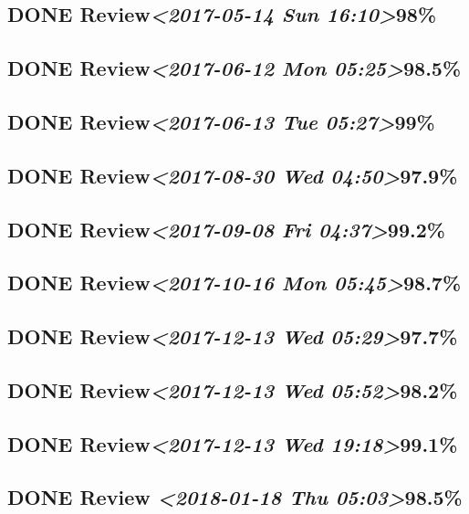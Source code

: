 \documentclass[11pt]{ctexart}
\begin{document}
\subsection{{\bfseries\sffamily DONE} Review\textit{<2017-05-14 Sun 16:10>}98\%}
\label{sec:org10a5b18}
\subsection{{\bfseries\sffamily DONE} Review\textit{<2017-06-12 Mon 05:25>}98.5\%}
\label{sec:orgee1e96c}
\subsection{{\bfseries\sffamily DONE} Review\textit{<2017-06-13 Tue 05:27>}99\%}
\label{sec:orgb09b23d}
\subsection{{\bfseries\sffamily DONE} Review\textit{<2017-08-30 Wed 04:50>}97.9\%}
\label{sec:orgdab734c}
\subsection{{\bfseries\sffamily DONE} Review\textit{<2017-09-08 Fri 04:37>}99.2\%}
\label{sec:orgd4b1a42}
\subsection{{\bfseries\sffamily DONE} Review\textit{<2017-10-16 Mon 05:45>}98.7\%}
\label{sec:orgf39b70f}

\subsection{{\bfseries\sffamily DONE} Review\textit{<2017-12-13 Wed 05:29>}97.7\%}
\label{sec:org3df3df8}
\subsection{{\bfseries\sffamily DONE} Review\textit{<2017-12-13 Wed 05:52>}98.2\%}
\label{sec:org17282e8}
\subsection{{\bfseries\sffamily DONE} Review\textit{<2017-12-13 Wed 19:18>}99.1\%}
\label{sec:org23175d0}
\subsection{{\bfseries\sffamily DONE} Review \textit{<2018-01-18 Thu 05:03>}98.5\%}
\label{sec:org6d6f2e6}
\end{document}
